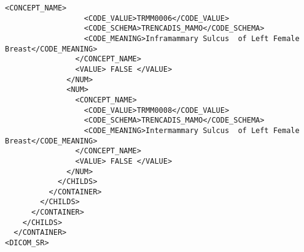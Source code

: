 \begin{lstlisting}[label=dicom-report,caption=Informe estructurado de una exploración de mama]
                <CONCEPT_NAME>
                  <CODE_VALUE>TRMM0006</CODE_VALUE>
                  <CODE_SCHEMA>TRENCADIS_MAMO</CODE_SCHEMA>
                  <CODE_MEANING>Inframammary Sulcus  of Left Female Breast</CODE_MEANING>
                </CONCEPT_NAME>
                <VALUE> FALSE </VALUE>
              </NUM>
              <NUM>
                <CONCEPT_NAME>
                  <CODE_VALUE>TRMM0008</CODE_VALUE>
                  <CODE_SCHEMA>TRENCADIS_MAMO</CODE_SCHEMA>
                  <CODE_MEANING>Intermammary Sulcus  of Left Female Breast</CODE_MEANING>
                </CONCEPT_NAME>
                <VALUE> FALSE </VALUE>
              </NUM>
            </CHILDS>
          </CONTAINER>
        </CHILDS>
      </CONTAINER>
    </CHILDS>
  </CONTAINER>
<DICOM_SR>

\end{lstlisting}
